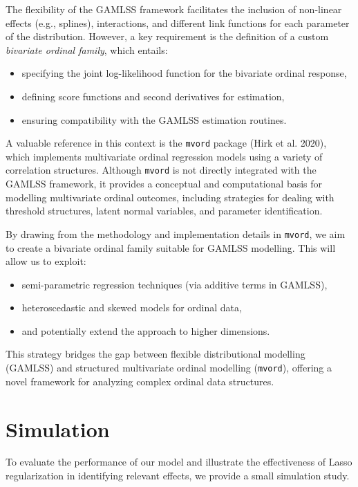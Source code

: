 \documentclass[submit]{smj}
\begin{document}
The flexibility of the GAMLSS framework facilitates the inclusion of non-linear effects (e.g., splines), interactions, and different link functions for each parameter of the distribution. However, a key requirement is the definition of a custom \textit{bivariate ordinal family}, which entails:
\begin{itemize}
  \item specifying the joint log-likelihood function for the bivariate ordinal response,
  \item defining score functions and second derivatives for estimation,
  \item ensuring compatibility with the GAMLSS estimation routines.
\end{itemize}

A valuable reference in this context is the \texttt{mvord} package (Hirk et al. 2020), which implements multivariate ordinal regression models using a variety of correlation structures. Although \texttt{mvord} is not directly integrated with the GAMLSS framework, it provides a conceptual and computational basis for modelling multivariate ordinal outcomes, including strategies for dealing with threshold structures, latent normal variables, and parameter identification.

By drawing from the methodology and implementation details in \texttt{mvord}, we aim to create a bivariate ordinal family suitable for GAMLSS modelling. This will allow us to exploit:
\begin{itemize}
  \item semi-parametric regression techniques (via additive terms in GAMLSS),
  \item heteroscedastic and skewed models for ordinal data,
  \item and potentially extend the approach to higher dimensions. %
\end{itemize}

This strategy bridges the gap between flexible distributional modelling (GAMLSS) and structured multivariate ordinal modelling (\texttt{mvord}), offering a novel framework for analyzing complex ordinal data structures.

\section{Simulation}\label{sec:simulation}
To evaluate the performance of our model and illustrate the effectiveness of Lasso regularization in identifying relevant effects, we provide a small simulation study.
\end{document}
